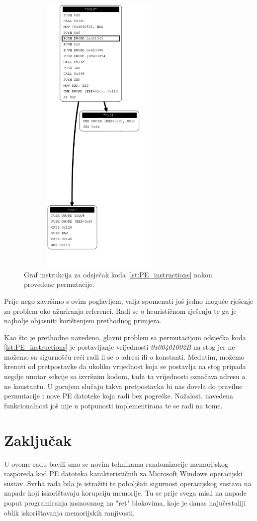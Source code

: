\documentclass[times, utf8, diplomski, numeric]{fer}
\begin{document}
\begin{figure}[!htb]
\centering
\setlength\fboxsep{0pt}
\setlength\fboxrule{0.5pt}
\includegraphics[width=8cm, height=14cm]{slike/permutator_graph_permutated}
\caption{Graf instrukcija za odsječak koda \ref{lst:PE_instructions} nakon provedene permutacije.}
\label{fig:control_flow_graph_permutated} 
\end{figure}
Prije nego završimo s ovim poglavljem, valja spomenuti još jedno moguće rješenje za problem oko ažuriranja referenci. Radi se o heurističnom rješenju te ga je najbolje objasniti korištenjem prethodnog primjera.

Kao što je prethodno navedeno, glavni problem sa permutacijom odsječka koda \ref{lst:PE_instructions} je postavljanje vrijednosti \emph{0x00401002B} na stog jer ne možemo sa sigurnošću reći radi li se o adresi ili o konstanti. Međutim, možemo krenuti od pretpostavke da ukoliko vrijednost koja se postavlja na stog pripada negdje unutar sekcije sa izvršnim kodom, tada ta vrijednosti označava adresu a ne konstantu. U gornjem slučaju takva pretpostavka bi nas dovela do pravilne permutacije i nove PE datoteke koja radi bez pogreške. Nažalost, navedena funkcionalnost još nije u potpunosti implementirana te se radi na tome.


\chapter{Zaključak}
U ovome radu bavili smo se novim tehnikama randomizacije
memorijskog rasporeda kod PE datoteka karakterističnih za
Microsoft Windows operacijski sustav. Svrha rada bila je
istražiti te poboljšati sigurnost operacijskog sustava na napade
koji iskorištavaju korupciju memorije. Tu se prije svega misli na
napade poput programiranja zasnovanog na "ret" blokovima, koje je
danas najučestaliji oblik iskorištavanja memorijskih ranjivosti.
\end{document}
